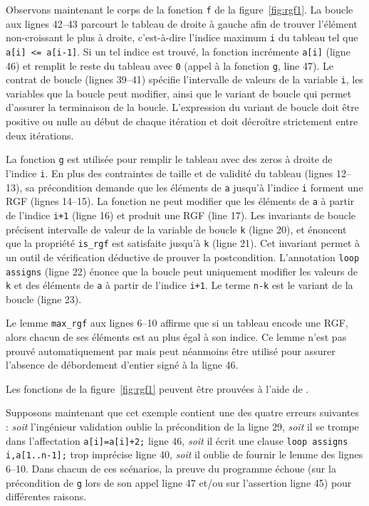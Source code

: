 Observons maintenant le corps de la fonction \lstinline{f} de la
figure~\ref{fig:rgf1}. 
La boucle aux lignes 42--43 parcourt le tableau de droite à gauche afin de
trouver l'élément non-croissant le plus à droite, c'est-à-dire l'indice maximum
\lstinline{i} du tableau tel que \lstinline{a[i] <= a[i-1]}.
Si un tel indice est trouvé, la fonction incrémente \lstinline{a[i]} (ligne 46)
et remplit le reste du tableau avec \lstinline{0} (appel à la fonction
\lstinline{g}, line 47).
Le contrat de boucle (lignes 39--41) spécifie l'intervalle de valeurs de la
variable \lstinline'i', les variables que la boucle peut modifier, ainsi que
le variant de boucle qui permet d'assurer la terminaison de la boucle.
L'expression du variant de boucle doit être positive ou nulle au début de chaque
itération et doit décroître strictement entre deux itérations.

La fonction \lstinline{g} est utilisée pour remplir le tableau avec des zeros
à droite de l'indice \lstinline{i}.
En plus des contraintes de taille et de validité du tableau (lignes 12--13),
sa précondition demande que les éléments de \lstinline{a} jusqu'à l'indice
\lstinline{i} forment une RGF (lignes 14--15).
La fonction ne peut modifier que les éléments de \lstinline{a} à partir de
l'indice \lstinline{i+1} (ligne 16) et produit une RGF (line 17).
Les invariants de boucle précisent intervalle de valeur de la variable de
boucle \lstinline{k} (ligne 20), et énoncent que la propriété \lstinline{is_rgf}
est satisfaite jusqu'à \lstinline{k} (ligne 21).
Cet invariant permet à un outil de vérification déductive de prouver la
postcondition.
L'annotation \lstinline{loop assigns} (ligne 22) énonce que la boucle peut
uniquement modifier les valeurs de \lstinline{k} et des éléments de
\lstinline{a} à partir de l'indice \lstinline{i+1}.
Le terme \lstinline{n-k} est le variant de la boucle (ligne 23).

Le \acsl lemme \lstinline'max_rgf' aux lignes 6--10 affirme que si un tableau
encode une RGF, alors chacun de ses éléments est au plus égal à son indice.
Ce lemme n'est pas prouvé automatiquement par \Wp mais peut néanmoins être
utilisé pour assurer l'absence de débordement d'entier signé à la ligne 46.

Les fonctions de la figure~\ref{fig:rgf1} peuvent être prouvées à l'aide de \Wp.


Supposons maintenant que cet exemple contient une des quatre erreurs suivantes :
\emph{soit} l'ingénieur validation oublie la précondition de la ligne 29,
\emph{soit} il se trompe dans l'affectation \lstinline[style=c]'a[i]=a[i]+2;'
ligne 46, \emph{soit} il écrit une clause
\lstinline[style=c]'loop assigns i,a[1..n-1];' trop imprécise ligne 40,
\emph{soit} il oublie de fournir le lemme des lignes 6--10.
Dans chacun de ces scénarios, la preuve du programme échoue (sur la précondition
de \lstinline{g} lors de son appel ligne 47 et/ou sur l'assertion ligne 45)
pour différentes raisons.


